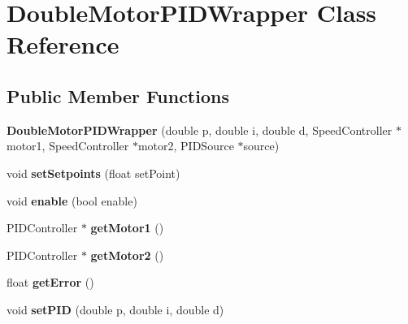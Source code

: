 \hypertarget{class_double_motor_p_i_d_wrapper}{}\section{Double\+Motor\+P\+I\+D\+Wrapper Class Reference}
\label{class_double_motor_p_i_d_wrapper}
\subsection*{Public Member Functions}
\begin{DoxyCompactItemize}
\item 
\hypertarget{class_double_motor_p_i_d_wrapper_a10b30d7946b3c9e9250c93b2b892a7f9}{}{\bfseries Double\+Motor\+P\+I\+D\+Wrapper} (double p, double i, double d, Speed\+Controller $\ast$motor1, Speed\+Controller $\ast$motor2, P\+I\+D\+Source $\ast$source)\label{class_double_motor_p_i_d_wrapper_a10b30d7946b3c9e9250c93b2b892a7f9}

\item 
\hypertarget{class_double_motor_p_i_d_wrapper_a55a70482b8a1abbf8fd9ccded9ef5135}{}void {\bfseries set\+Setpoints} (float set\+Point)\label{class_double_motor_p_i_d_wrapper_a55a70482b8a1abbf8fd9ccded9ef5135}

\item 
\hypertarget{class_double_motor_p_i_d_wrapper_a3f47c242b4e631d329ce00049f266659}{}void {\bfseries enable} (bool enable)\label{class_double_motor_p_i_d_wrapper_a3f47c242b4e631d329ce00049f266659}

\item 
\hypertarget{class_double_motor_p_i_d_wrapper_af2348ab886b84d8057db8db2403da907}{}P\+I\+D\+Controller $\ast$ {\bfseries get\+Motor1} ()\label{class_double_motor_p_i_d_wrapper_af2348ab886b84d8057db8db2403da907}

\item 
\hypertarget{class_double_motor_p_i_d_wrapper_ad184a4e2492a70a2377bfd4c830a2c2e}{}P\+I\+D\+Controller $\ast$ {\bfseries get\+Motor2} ()\label{class_double_motor_p_i_d_wrapper_ad184a4e2492a70a2377bfd4c830a2c2e}

\item 
\hypertarget{class_double_motor_p_i_d_wrapper_a570e48c68317a6f5d8b1ce9a7eb52ac5}{}float {\bfseries get\+Error} ()\label{class_double_motor_p_i_d_wrapper_a570e48c68317a6f5d8b1ce9a7eb52ac5}

\item 
\hypertarget{class_double_motor_p_i_d_wrapper_a292eb45fe4b51c2626724c7a11174737}{}void {\bfseries set\+P\+I\+D} (double p, double i, double d)\label{class_double_motor_p_i_d_wrapper_a292eb45fe4b51c2626724c7a11174737}


\end{DoxyCompactItemize}
